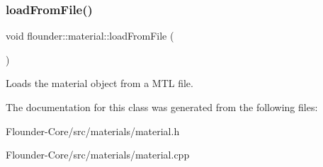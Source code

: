 \subsubsection{\texorpdfstring{load\+From\+File()}{loadFromFile()}}
{\footnotesize\ttfamily void flounder\+::material\+::load\+From\+File (\begin{DoxyParamCaption}{ }\end{DoxyParamCaption})\hspace{0.3cm}{\ttfamily [private]}}



Loads the material object from a M\+TL file. 



The documentation for this class was generated from the following files\+:\begin{DoxyCompactItemize}
\item 
Flounder-\/\+Core/src/materials/material.\+h\item 
Flounder-\/\+Core/src/materials/material.\+cpp\end{DoxyCompactItemize}
